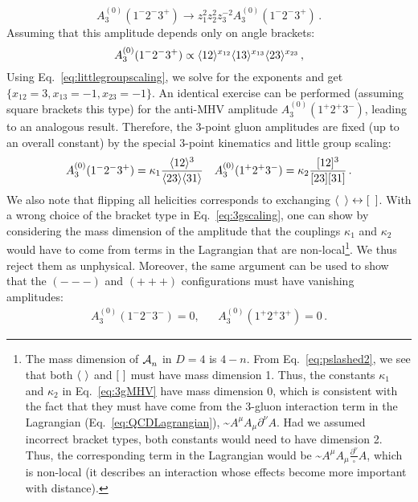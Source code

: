 \documentclass[main.tex]{subfiles}
\begin{document}
\begin{equation}
    A_3^{(0)} (1^-2^-3^+) \rightarrow z_1^2 z_2^2 z_3^{-2} A_3^{(0)}(1^-2^-3^+) \,.
\end{equation}
Assuming that this amplitude depends only on angle brackets:
\begin{equation} \label{eq:3gscaling}
    A_3^{(0)} (1^-2^-3^+) \propto \langle 12 \rangle^{x_{12}} \langle 13 \rangle^{x_{13}} \langle 23 \rangle^{x_{23}} \,,
\end{equation}
Using Eq.~\ref{eq:littlegroupscaling}, we solve for the exponents and get $\{x_{12} = 3, x_{13} = -1, x_{23} = -1\}$. An identical exercise can be performed (assuming square brackets this type) for the anti-MHV amplitude $A_3^{(0)} (1^+2^+3^-)$, leading to an analogous result. Therefore, the 3-point gluon amplitudes are fixed (up to an overall constant) by the special 3-point kinematics and little group scaling:
\begin{align} \label{eq:3gMHV}
    A_3^{(0)} (1^-2^-3^+) = \kappa_1 \frac{\langle 12 \rangle^3}{\langle 23 \rangle\langle 31 \rangle} && A_3^{(0)} (1^+2^+3^-) = \kappa_2 \frac{[ 12 ]^3}{[ 23 ][ 31 ]} \,.
\end{align}
We also note that flipping all helicities corresponds to exchanging $\langle \phantom{p} \rangle \leftrightarrow [ \phantom{p} ]$. With a wrong choice of the bracket type in Eq.~\ref{eq:3gscaling}, one can show by considering the mass dimension of the amplitude that the couplings $\kappa_1$ and $\kappa_2$ would have to come from terms in the Lagrangian that are non-local\footnote{The mass dimension of $\mathcal{A}_{n}^{}$ in $D=4$ is $4-n$. From Eq.~\ref{eq:pslashed2}, we see that both $\langle \phantom{i} \rangle$ and $\braketsq$ must have mass dimension 1. Thus, the constants $\kappa_1$ and $\kappa_2$ in Eq.~\ref{eq:3gMHV} have mass dimension 0, which is consistent with the fact that they must have come from the 3-gluon interaction term in the Lagrangian (Eq.~\ref{eq:QCDLagrangian}), \textasciitilde$A^\mu A_\mu \partial^\nu A$. Had we assumed incorrect bracket types, both constants would need to have dimension 2. Thus, the corresponding term in the Lagrangian would be \textasciitilde$A^\mu A_\mu \frac{\partial^\nu}{\square} A$, which is non-local (it describes an interaction whose effects become more important with distance).}. We thus reject them as unphysical. Moreover, the same argument can be used to show that the $(---)$ and $(+++)$ configurations must have vanishing amplitudes:
\begin{align}
    A_3^{(0)} (1^-2^-3^-) = 0, && A_3^{(0)} (1^+2^+3^+) = 0\,.
\end{align}
\end{document}
